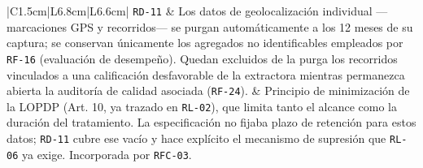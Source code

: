 \documentclass[11pt,a4paper]{article}
\newcommand{\id}[1]{\texttt{\begingroup\hyphenpenalty=10000\relax#1\endgroup}}
\renewcommand{\id}[1]{\texttt{#1}}
\begin{document}
\begin{longtable}{|C{1.5cm}|L{6.8cm}|L{6.6cm}|}
\id{RD-11} & Los datos de geolocalización individual ---marcaciones GPS y recorridos--- se purgan automáticamente a los 12 meses de su captura; se conservan únicamente los agregados no identificables empleados por \id{RF-16} (evaluación de desempeño). Quedan excluidos de la purga los recorridos vinculados a una calificación desfavorable de la extractora mientras permanezca abierta la auditoría de calidad asociada (\id{RF-24}). & Principio de minimización de la LOPDP \cite{lopdp} (Art. 10, ya trazado en \id{RL-02}), que limita tanto el alcance como la duración del tratamiento. La especificación no fijaba plazo de retención para estos datos; \id{RD-11} cubre ese vacío y hace explícito el mecanismo de supresión que \id{RL-06} ya exige. Incorporada por \id{RFC-03}. \\ \hline
\caption{Restricciones de diseño del SIMPA}
\end{longtable}







\newpage
\nocite{wohlin2012,runeson2009,molleri2020,hennink2017,cohen1960,wilkinson2016,nosek2018}




\end{document}
